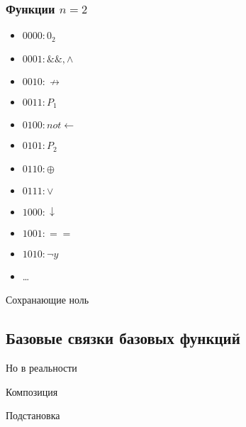 \documentclass[a4paper, 12pt]{article}
\begin{document}
    \subsubsection{Функции $n = 2$}
    \begin{itemize}
        \item $0000: 0_2$
        \item $0001: \&\&, \land$
        \item $0010: \not \rightarrow$
        \item $0011: P_1$
        \item $0100: not \leftarrow$
        \item $0101: P_2$
        \item $0110: \oplus$
        \item $0111: \vee$
        \item $1000: \downarrow$
        \item $1001: ==$
        \item $1010: \lnot y$
        \item \dots %
    \end{itemize}


    \begin{definition}
        Сохранающие ноль
    \end{definition}


    \subsection{Базовые связки базовых функций}

    Но в реальности 

    \begin{definition}
        Композиция
    \end{definition}

    \begin{definition}
        Подстановка
    \end{definition}
\end{document}
